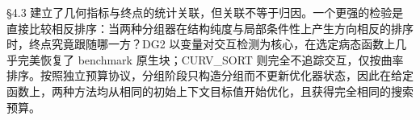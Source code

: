 §4.3 建立了几何指标与终点的统计关联，但关联不等于归因。一个更强的检验是直接比较相反排序：当两种分组器在结构纯度与局部条件性上产生方向相反的排序时，终点究竟跟随哪一方？DG2 以变量对交互检测为核心，在选定病态函数上几乎完美恢复了 benchmark 原生块；CURV\_SORT 则完全不追踪交互，仅按曲率排序。按照独立预算协议，分组阶段只构造分组而不更新优化器状态，因此在给定函数上，两种方法均从相同的初始上下文目标值开始优化，且获得完全相同的搜索预算。
